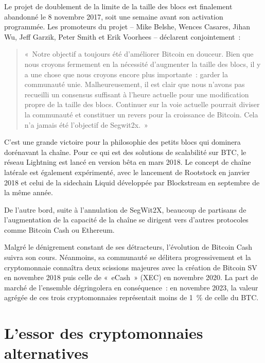 Le projet de doublement de la limite de la taille des blocs est finalement abandonné le 8 novembre 2017, soit une semaine avant son activation programmée. Les promoteurs du projet -- Mike Belshe, Wences Casares, Jihan Wu, Jeff Garzik, Peter Smith et Erik Voorhees -- déclarent conjointement~:

\begin{quote}
«~Notre objectif a toujours été d'améliorer Bitcoin en douceur. Bien que nous croyons fermement en la nécessité d'augmenter la taille des blocs, il y a une chose que nous croyons encore plus importante~: garder la communauté unie. Malheureusement, il est clair que nous n'avons pas recueilli un consensus suffisant à l'heure actuelle pour une modification propre de la taille des blocs. Continuer sur la voie actuelle pourrait diviser la communauté et constituer un revers pour la croissance de Bitcoin. Cela n'a jamais été l'objectif de Segwit2x.~»
\end{quote}

C'est une grande victoire pour la philosophie des petits blocs qui dominera dorénavant la chaîne. Pour ce qui est des solutions de scalabilité sur BTC, le réseau Lightning est lancé en version bêta en mars 2018. Le concept de chaîne latérale est également expérimenté, avec le lancement de Rootstock en janvier 2018 et celui de la sidechain Liquid développée par Blockstream en septembre de la même année.

De l'autre bord, suite à l'annulation de SegWit2X, beaucoup de partisans de l'augmentation de la capacité de la chaîne se dirigent vers d'autres protocoles comme Bitcoin Cash ou Ethereum.

Malgré le dénigrement constant de ses détracteurs, l'évolution de Bitcoin Cash suivra son cours. Néanmoins, sa communauté se délitera progressivement et la cryptomonnaie connaîtra deux scissions majeures avec la création de Bitcoin SV en novembre 2018 puis celle de «~eCash~» (XEC) en novembre 2020. La part de marché de l'ensemble dégringolera en conséquence~: en novembre 2023, la valeur agrégée de ces trois cryptomonnaies représentait moins de 1~\% de celle du BTC.

\section*{L'essor des cryptomonnaies alternatives}


